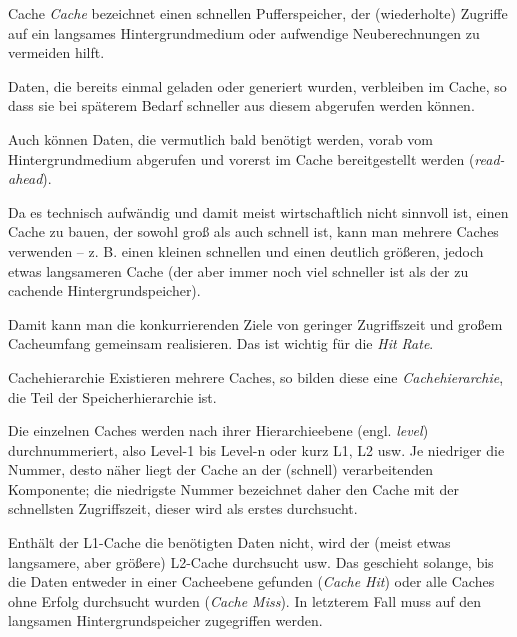 \begin{defi}{Cache}
  \emph{Cache} bezeichnet einen schnellen Pufferspeicher, der (wiederholte) Zugriffe auf ein langsames Hintergrundmedium oder aufwendige Neuberechnungen zu vermeiden hilft.

  Daten, die bereits einmal geladen oder generiert wurden, verbleiben im Cache, so dass sie bei späterem Bedarf schneller aus diesem abgerufen werden können.

  Auch können Daten, die vermutlich bald benötigt werden, vorab vom Hintergrundmedium abgerufen und vorerst im Cache bereitgestellt werden (\emph{read-ahead}).

  Da es technisch aufwändig und damit meist wirtschaftlich nicht sinnvoll ist, einen Cache zu bauen, der sowohl groß als auch schnell ist, kann man mehrere Caches verwenden -- z. B. einen kleinen schnellen und einen deutlich größeren, jedoch etwas langsameren Cache (der aber immer noch viel schneller ist als der zu cachende Hintergrundspeicher).

  Damit kann man die konkurrierenden Ziele von geringer Zugriffszeit und großem Cacheumfang gemeinsam realisieren.
  Das ist wichtig für die \emph{Hit Rate}.
\end{defi}

\begin{defi}{Cachehierarchie}
  Existieren mehrere Caches, so bilden diese eine \emph{Cachehierarchie}, die Teil der Speicherhierarchie ist.

  Die einzelnen Caches werden nach ihrer Hierarchieebene (engl. \emph{level}) durchnummeriert, also Level-1 bis Level-n oder kurz L1, L2 usw.
  Je niedriger die Nummer, desto näher liegt der Cache an der (schnell) verarbeitenden Komponente;
  die niedrigste Nummer bezeichnet daher den Cache mit der schnellsten Zugriffszeit, dieser wird als erstes durchsucht.

  Enthält der L1-Cache die benötigten Daten nicht, wird der (meist etwas langsamere, aber größere) L2-Cache durchsucht usw.
  Das geschieht solange, bis die Daten entweder in einer Cacheebene gefunden (\emph{Cache Hit}) oder alle Caches ohne Erfolg durchsucht wurden (\emph{Cache Miss}).
  In letzterem Fall muss auf den langsamen Hintergrundspeicher zugegriffen werden.
\end{defi}

